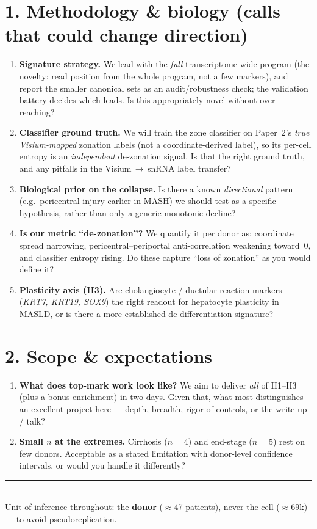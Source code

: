 \documentclass[11pt]{article}
\begin{document}
\section{1. Methodology \& biology (calls that could change direction)}
\begin{enumerate}
  \item \textbf{Signature strategy.} We lead with the \emph{full} transcriptome-wide program (the
  novelty: read position from the whole program, not a few markers), and report the smaller
  canonical sets as an audit/robustness check; the validation battery decides which leads. Is this
  appropriately novel without over-reaching?
  \item \textbf{Classifier ground truth.} We will train the zone classifier on Paper~2's
  \emph{true Visium-mapped} zonation labels (not a coordinate-derived label), so its per-cell entropy
  is an \emph{independent} de-zonation signal. Is that the right ground truth, and any pitfalls in the
  Visium\,$\rightarrow$\,snRNA label transfer?
  \item \textbf{Biological prior on the collapse.} Is there a known \emph{directional} pattern (e.g.\
  pericentral injury earlier in MASH) we should test as a specific hypothesis, rather than only a
  generic monotonic decline?
  \item \textbf{Is our metric ``de-zonation''?} We quantify it per donor as: coordinate spread
  narrowing, pericentral--periportal anti-correlation weakening toward~0, and classifier entropy
  rising. Do these capture ``loss of zonation'' as you would define it?
  \item \textbf{Plasticity axis (H3).} Are cholangiocyte / ductular-reaction markers
  (\textit{KRT7, KRT19, SOX9}) the right readout for hepatocyte plasticity in MASLD, or is there a
  more established de-differentiation signature?
\end{enumerate}

\section{2. Scope \& expectations}
\begin{enumerate}
  \item \textbf{What does top-mark work look like?} We aim to deliver \emph{all} of H1--H3 (plus a
  bonus enrichment) in two days. Given that, what most distinguishes an excellent project here ---
  depth, breadth, rigor of controls, or the write-up / talk?
  \item \textbf{Small $n$ at the extremes.} Cirrhosis ($n{=}4$) and end-stage ($n{=}5$) rest on few
  donors. Acceptable as a stated limitation with donor-level confidence intervals, or would you
  handle it differently?
\end{enumerate}

\vfill
{\color{teal}\rule{\textwidth}{0.4pt}}\\[2pt]
\footnotesize Unit of inference throughout: the \textbf{donor} ($\approx$47 patients), never the cell
($\approx$69k) --- to avoid pseudoreplication.
\end{document}
